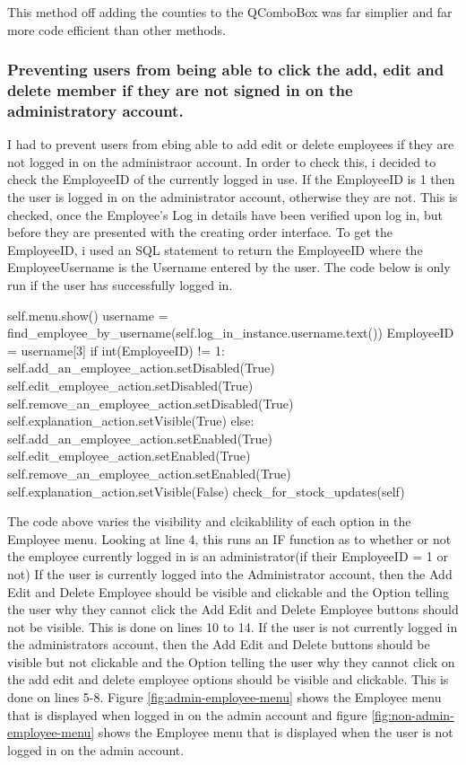 This method off adding the counties to the QComboBox was far simplier and far more code efficient than other methods.

\pagebreak

\subsubsection{Preventing users from being able to click the add, edit and delete member if they are not signed in on the administratory account.}

I had to prevent users from ebing able to add edit or delete employees if they are not logged in on the administraor account. In order to check this, i decided to check the EmployeeID of the currently logged in use. If the EmployeeID is 1 then the user is logged in on the administrator account, otherwise they are not. This is checked, once the Employee's Log in details have been verified upon log in, but before they are presented with the creating order interface. To get the EmployeeID, i used an SQL statement to return the EmployeeID where the EmployeeUsername is the Username entered by the user. The code below is only run if the user has successfully logged in.

\begin{python}
self.menu.show()
username = find_employee_by_username(self.log_in_instance.username.text())
EmployeeID = username[3]
if int(EmployeeID) != 1:
	self.add_an_employee_action.setDisabled(True)
	self.edit_employee_action.setDisabled(True)
	self.remove_an_employee_action.setDisabled(True)
	self.explanation_action.setVisible(True)
else:
	self.add_an_employee_action.setEnabled(True)
	self.edit_employee_action.setEnabled(True)
	self.remove_an_employee_action.setEnabled(True)
	self.explanation_action.setVisible(False)
	check_for_stock_updates(self)

\end{python}


The code above varies the visibility and clcikablility of each option in the Employee menu. Looking at line 4, this runs an IF function as to whether or not the employee currently logged in is an administrator(if their EmployeeID = 1 or not) If the user is currently logged into the Administrator account, then the Add Edit and Delete Employee should be visible and clickable and the Option telling the user why they cannot click the Add Edit and Delete Employee buttons should not be visible. This is done on lines 10 to 14. If the user is not currently logged in the administrators account, then the Add Edit and Delete buttons should be visible but not clickable and the Option telling the user why they cannot click on the add edit and delete employee options should be visible and clickable. This is done on lines 5-8. Figure \ref{fig:admin-employee-menu} shows the Employee menu that is displayed when logged in on the admin account and figure \ref{fig:non-admin-employee-menu} shows the Employee menu that is displayed when the user is not logged in on the admin account.



